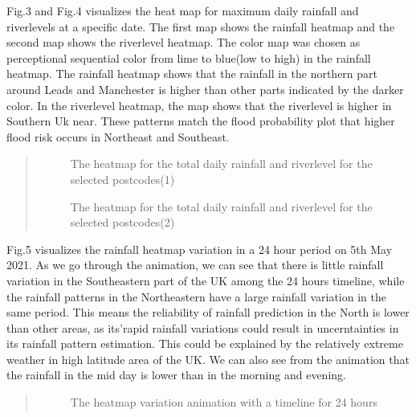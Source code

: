 \documentclass[letterpaper,10pt,english]{sphinxmanual}
\let\sphinxpxdimen\pdfpxdimen\else\newdimen\sphinxpxdimen
\begin{document}
\sphinxAtStartPar
Fig.3 and Fig.4 visualizes the heat map for maximum daily rainfall and riverlevels at a specific date. The first map shows the rainfall heatmap and the second map shows the riverlevel heatmap. The color map was chosen as perceptional sequential color from lime to blue(low to high) in the rainfall heatmap. The rainfall heatmap shows that the rainfall in the northern part around Leads and Manchester is higher than other parts indicated by the darker color. In the riverlevel heatmap, the map shows that the riverlevel is higher in Southern Uk near. These patterns match the flood probability plot that higher flood risk occurs in Northeast and Southeast.
\begin{quote}

\begin{figure}[htbp]
\centering
\capstart

\noindent\sphinxincludegraphics[width=500\sphinxpxdimen]{{pic3}.png}
\caption{The heatmap for the total daily rainfall and riverlevel for the selected postcodes(1)}\label{\detokenize{index:id9}}\end{figure}

\begin{figure}[htbp]
\centering
\capstart

\noindent\sphinxincludegraphics[width=500\sphinxpxdimen]{{pic4}.png}
\caption{The heatmap for the total daily rainfall and riverlevel for the selected postcodes(2)}\label{\detokenize{index:id10}}\end{figure}
\end{quote}

\sphinxAtStartPar
Fig.5 visualizes the rainfall heatmap variation in a 24 hour period on 5th May 2021. As we go through the animation, we can see that there is little rainfall variation in the South\sphinxhyphen{}eastern part of the UK among the 24 hours timeline, while the rainfall patterns in the North\sphinxhyphen{}eastern have a large rainfall variation in the same period. This means the reliability of rainfall prediction in the North is lower than other areas, as its’rapid rainfall variations could result in uncerntainties in its rainfall pattern estimation. This could be explained by the relatively extreme weather in high latitude area of the UK. We can also see from the animation that the rainfall in the mid day is lower than in the morning and evening.
\begin{quote}

\begin{figure}[htbp]
\centering
\capstart

\noindent\sphinxincludegraphics[width=500\sphinxpxdimen]{{pic5}.png}
\caption{The heatmap variation animation with a timeline for 24 hours}\label{\detokenize{index:id11}}\end{figure}
\end{quote}
\end{document}
